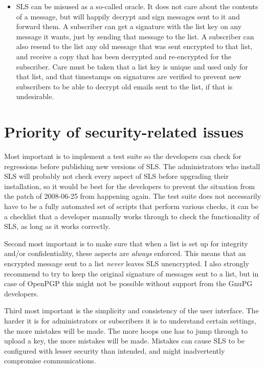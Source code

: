 \documentclass[a4]{article}
\begin{document}
\begin{itemize}
\item
SLS can be misused as a so-called oracle.
It does not care about the contents of a message, but will happily decrypt and sign messages sent to it and forward them.
A subscriber can get a signature with the list key on any message it wants, just by sending that message to the list.
A subscriber can also resend to the list any old message that was sent encrypted to that list,
and receive a copy that has been decrypted and re-encrypted for the subscriber.
Care must be taken that a list key is unique and used only for that list,
and that timestamps on signatures are verified to prevent new subscribers to be able to decrypt old emails sent to the list, if that is undesirable.
\end{itemize}

\section{Priority of security-related issues}

Most important is to implement a test suite so the developers can check for regressions before publishing new versions of SLS.
The administrators who install SLS will probably not check every aspect of SLS before upgrading their installation,
so it would be best for the developers to prevent the situation from the patch of 2008-06-25 from happening again.
The test suite does not necessarily have to be a fully automated set of scripts that perform various checks,
it can be a checklist that a developer manually works through to check the functionality of SLS,
as long as it works correctly.

Second most important is to make sure that when a list is set up for integrity and/or confidentiality, these aspects are {\em always} enforced.
This means that an encrypted message sent to a list {\em never} leaves SLS unencrypted.
I also strongly recommend to try to keep the original signature of messages sent to a list,
but in case of OpenPGP this might not be possible without support from the GnuPG developers.

Third most important is the simplicity and consistency of the user interface.
The harder it is for administrators or subscribers it is to understand certain settings,
the more mistakes will be made.
The more hoops one has to jump through to upload a key,
the more mistakes will be made.
Mistakes can cause SLS to be configured with lesser security than intended, and might inadvertently compromise communications.
\end{document}
